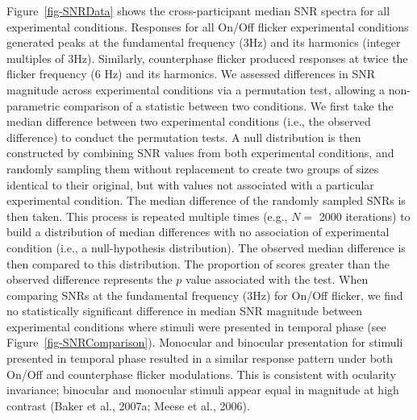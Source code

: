\documentclass[
  12pt,
]{article}
\begin{document}
Figure~\ref{fig-SNRData} shows the cross-participant median SNR spectra
for all experimental conditions. Responses for all On/Off flicker
experimental conditions generated peaks at the fundamental frequency
(3Hz) and its harmonics (integer multiples of 3Hz). Similarly,
counterphase flicker produced responses at twice the flicker frequency
(6 Hz) and its harmonics. We assessed differences in SNR magnitude
across experimental conditions via a permutation test, allowing a
non-parametric comparison of a statistic between two conditions. We
first take the median difference between two experimental conditions
(i.e., the observed difference) to conduct the permutation tests. A null
distribution is then constructed by combining SNR values from both
experimental conditions, and randomly sampling them without replacement
to create two groups of sizes identical to their original, but with
values not associated with a particular experimental condition. The
median difference of the randomly sampled SNRs is then taken. This
process is repeated multiple times (e.g., \(N =\) 2000 iterations) to
build a distribution of median differences with no association of
experimental condition (i.e., a null-hypothesis distribution). The
observed median difference is then compared to this distribution. The
proportion of scores greater than the observed difference represents the
\(p\) value associated with the test. When comparing SNRs at the
fundamental frequency (3Hz) for On/Off flicker, we find no statistically
significant difference in median SNR magnitude between experimental
conditions where stimuli were presented in temporal phase (see
Figure~\ref{fig-SNRComparison}). Monocular and binocular presentation
for stimuli presented in temporal phase resulted in a similar response
pattern under both On/Off and counterphase flicker modulations. This is
consistent with ocularity invariance; binocular and monocular stimuli
appear equal in magnitude at high contrast (Baker et al., 2007a; Meese
et al., 2006).
\end{document}
